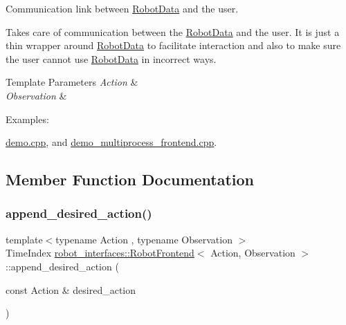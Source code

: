 Communication link between \hyperlink{classrobot__interfaces_1_1RobotData}{Robot\+Data} and the user. 

Takes care of communication between the \hyperlink{classrobot__interfaces_1_1RobotData}{Robot\+Data} and the user. It is just a thin wrapper around \hyperlink{classrobot__interfaces_1_1RobotData}{Robot\+Data} to facilitate interaction and also to make sure the user cannot use \hyperlink{classrobot__interfaces_1_1RobotData}{Robot\+Data} in incorrect ways.


\begin{DoxyTemplParams}{Template Parameters}
{\em Action} & \\
\hline
{\em Observation} & \\
\hline
\end{DoxyTemplParams}
\begin{Desc}
\item[Examples\+: ]\par
\hyperlink{demo_8cpp-example}{demo.\+cpp}, and \hyperlink{demo_multiprocess_frontend_8cpp-example}{demo\+\_\+multiprocess\+\_\+frontend.\+cpp}.\end{Desc}


\subsection{Member Function Documentation}
\mbox{\label{classrobot__interfaces_1_1RobotFrontend_a26c137f65b908d6eddffff75df38361a}} 
\subsubsection{\texorpdfstring{append\+\_\+desired\+\_\+action()}{append\_desired\_action()}}
{\footnotesize\ttfamily template$<$typename Action , typename Observation $>$ \\
Time\+Index \hyperlink{classrobot__interfaces_1_1RobotFrontend}{robot\+\_\+interfaces\+::\+Robot\+Frontend}$<$ Action, Observation $>$\+::append\+\_\+desired\+\_\+action (\begin{DoxyParamCaption}\item[{const Action \&}]{desired\+\_\+action }\end{DoxyParamCaption})\hspace{0.3cm}{\ttfamily [inline]}}



